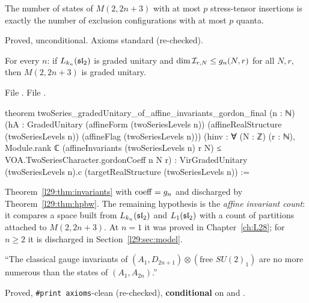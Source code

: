 \begin{physics}
The number of states of $M(2,2n+3)$ with at most $p$ stress-tensor insertions is exactly the number of exclusion
configurations with at most $p$ quanta.
\end{physics}

\begin{status}
Proved, unconditional. Axioms standard (re-checked).
\end{status}

\begin{theorem}\label{l29:thm:gordonfinal}
For every $n$: if $L_{k_n}(\mathfrak{sl}_2)$ is graded unitary and $\dim\mathcal I_{r,N}\le g_n(N,r)$
for all $N,r$, then $M(2,2n+3)$ is graded unitary.
\end{theorem}

\noindent File .
\noindent File .
\begin{leancode}
theorem twoSeries_gradedUnitary_of_affine_invariants_gordon_final (n : ℕ)
    (hA : GradedUnitary (affineForm (twoSeriesLevels n)) (affineRealStructure (twoSeriesLevels n))
      (affineFlag (twoSeriesLevels n)))
    (hinv : ∀ (N : ℤ) (r : ℕ), Module.rank ℂ (affineInvariants (twoSeriesLevels n) r N) ≤
      VOA.TwoSeriesCharacter.gordonCoeff n N r) :
    VirGradedUnitary (twoSeriesLevels n).c (targetRealStructure (twoSeriesLevels n)) :=
\end{leancode}

\begin{dictionary}
Theorem~\ref{l29:thm:invariants} with $\mathrm{coeff}=g_n$ and  discharged by
Theorem~\ref{l29:thm:hpbw}. The remaining hypothesis  is the \emph{affine invariant count}: it compares a
space built from $L_{k_n}(\mathfrak{sl}_2)$ and $L_1(\mathfrak{sl}_2)$ with a count of partitions attached to
$M(2,2n+3)$. At $n=1$ it was proved in Chapter~\ref{ch:L28}; for $n\ge2$ it is discharged in
Section~\ref{l29:sec:model}.
\end{dictionary}

\begin{physics}
``The classical gauge invariants of $(A_1,D_{2n+1})\otimes(\text{free }SU(2)_1)$ are no more numerous than the states
of $(A_1,A_{2n})$.''
\end{physics}

\begin{status}
Proved, \texttt{\#print axioms}-clean (re-checked), \textbf{conditional} on  and .
\end{status}

